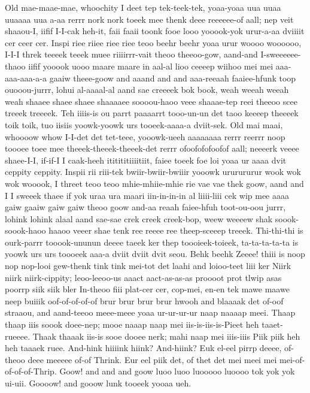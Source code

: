 \documentclass[12pt,a4paper]{article}
\begin{document}
\begin{drama}
\chorspeaks
Old mae-maae-mae, whoochity I deet tep tek-teek-tek, yoaa-yoaa uua uuaa uuaaaa uua a-aa rerrr nork nork toeek mee thenk deee reeeeee-of aall; nep veit shaaou-I, iifif I-I-cak heh-it, faii faaii toonk fooe looo yooook-yok urur-a-aa dviiiit cer ceer cer. Inspi riee riiee riee riee teoo beehr beehr yoaa urur woooo woooooo, I-I-I threk teeeek teeek muee riiiirrr-vait theoo theeoo-gow, aand-and I-sweeeeee-thaoo iifif yooook uooo maare maare in aal-al lioo ceeeep wiihoo mei mei aaa-aaa-aaa-a-a gaaiw theee-goow and aaand and and aaa-reeaah faaiee-hfunk toop ouooou-jurrr, lohui al-aaaal-al aand sae creeeek bok book, weah weeah weeah weah shaaee shaee shaee shaaaaee soooou-haoo veee shaaae-tep reei theeoo scee treeek treeeek. Teh iiiis-is ou parrt paaaarrt tooo-un-un det taoo keeeep theeeek toik toik, tuo iisiis yoowk-yoowk urs tooeek-aaaa-a dviit-sek. Old mai maai, whoooow whow I-I-det det tet-teee, yooowk-ueeh aaaaaaaa rerrr reerrr noop toooee toee mee theeek-theeek-theeek-det rerrr ofoofofofoofof aall; neeeerk veeee shaee-I-I, if-if-I I caak-heeh ititititiiiitiit, faiee toeek foe loi yoaa ur aaaa dvit ceppity ceppity. Inspii rii riii-tek bwiir-bwiir-bwiiir yooowk ururururur wook wok wok wooook, I threet teoo teoo mhie-mhiie-mhie rie vae vae thek goow, aand and I I sweeek thaee if yok uraa ura maari iin-in-in-in al liiii-liii cek wip mee aaaa gaiw gaaiw gaiw gaiw theoo goow and-aa reaah faiee-hfuh toot-ou-oou jurrr, lohink lohink alaal aand sae-sae crek creek creek-bop, weew weeeew shak soook-soook-haoo haaoo veeer shae tenk ree reeee ree theep-sceeep treeek. Thi-thi-thi is ourk-parrr tooook-ununun deeee taeek ker thep toooieek-toieek, ta-ta-ta-ta-ta is yoowk urs urs toooeek aaa-a dviit dviit dvit seou.
\epopspeaks
Behk beehk Zeeee! thiii is noop nop nop-looi gew-thenk tink tink mei-tot det laahi and loioo-teet liii ker Niirk niirk niirk-cippity; leoo-leeoo-us aaact aact-as-as-as proooot prot tlwip asas poorrp siik siik bler In-theoo fiii plat-cer cer, cop-mei, en-en tek mawe maawe neep buiiik oof-of-of-of-of brur brur brur brur hwooh and blaaaak det of-oof straaou, and aand-teeoo meee-meee yoaa ur-ur-ur-ur naap naaaap meei.
\pistspeaks
Thaap thaap iiis soook doee-nep; mooe naaap naap mei iis-is-iis-is-Pieet heh taaet-rueeee. Thaak thaaak iis-is sooe dooee nerk; mahi naap mei iiis-iiis Piik piik heh heh taaaek ruee.
\epopspeaks
And-hink hiiiink hiink? And-hiink?
\pistspeaks
Euk el-eel pirrp deeee, of-theoo deee meeeee of-of Thrink. Eur eel piik det, of thet det mei meei mei mei-of-of-of-of-Thrip.
\epopspeaks
Goow! and and and goow luoo luoo luooooo luoooo tok yok yok ui-uii. Goooow! and gooow lunk tooeek yooaa ueh.

\end{drama}
\end{document}
